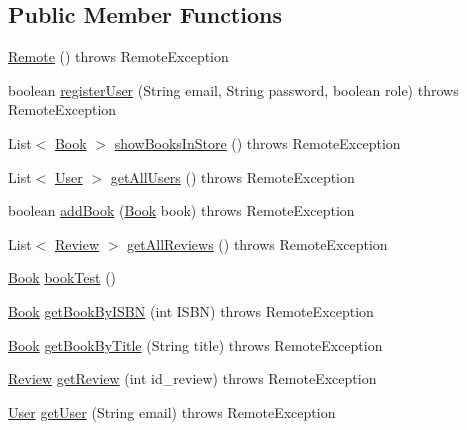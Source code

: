 \subsection*{Public Member Functions}
\begin{DoxyCompactItemize}
\item 
\hyperlink{classserver_1_1remote_1_1_remote_a023cdc695c53195005bf645a97307529}{Remote} ()  throws Remote\+Exception 
\item 
boolean \hyperlink{classserver_1_1remote_1_1_remote_ad3a381123e93a8e5ec26d84c4ff8b92f}{register\+User} (String email, String password, boolean role)  throws Remote\+Exception 
\item 
List$<$ \hyperlink{classserver_1_1data_1_1_book}{Book} $>$ \hyperlink{classserver_1_1remote_1_1_remote_a131873c01bc4fe829dd7d2385c89ca87}{show\+Books\+In\+Store} ()  throws Remote\+Exception 
\item 
List$<$ \hyperlink{classserver_1_1data_1_1_user}{User} $>$ \hyperlink{classserver_1_1remote_1_1_remote_a3d41acc8ab7328be2082573542758f07}{get\+All\+Users} ()  throws Remote\+Exception 
\item 
boolean \hyperlink{classserver_1_1remote_1_1_remote_a496fcecd259c1b527ffba62fc452afee}{add\+Book} (\hyperlink{classserver_1_1data_1_1_book}{Book} book)  throws Remote\+Exception
\item 
List$<$ \hyperlink{classserver_1_1data_1_1_review}{Review} $>$ \hyperlink{classserver_1_1remote_1_1_remote_a22538e64b45f5f93237b455100243b44}{get\+All\+Reviews} ()  throws Remote\+Exception 
\item 
\hyperlink{classserver_1_1data_1_1_book}{Book} \hyperlink{classserver_1_1remote_1_1_remote_a38bce20fa59064fe8d970164d6155435}{book\+Test} ()
\item 
\hyperlink{classserver_1_1data_1_1_book}{Book} \hyperlink{classserver_1_1remote_1_1_remote_a36ffc6f95ea75ad7d393ea296e1bc0cc}{get\+Book\+By\+I\+S\+BN} (int I\+S\+BN)  throws Remote\+Exception
\item 
\hyperlink{classserver_1_1data_1_1_book}{Book} \hyperlink{classserver_1_1remote_1_1_remote_a560427fc017e15f04e12bd880e6f086e}{get\+Book\+By\+Title} (String title)  throws Remote\+Exception
\item 
\hyperlink{classserver_1_1data_1_1_review}{Review} \hyperlink{classserver_1_1remote_1_1_remote_a98bd7181568c637a6cbcc0b72ebb9f95}{get\+Review} (int id\+\_\+review)  throws Remote\+Exception 
\item 
\hyperlink{classserver_1_1data_1_1_user}{User} \hyperlink{classserver_1_1remote_1_1_remote_abef8350014445d8f2d5ffb4c088e82b6}{get\+User} (String email)  throws Remote\+Exception 

\end{DoxyCompactItemize}
